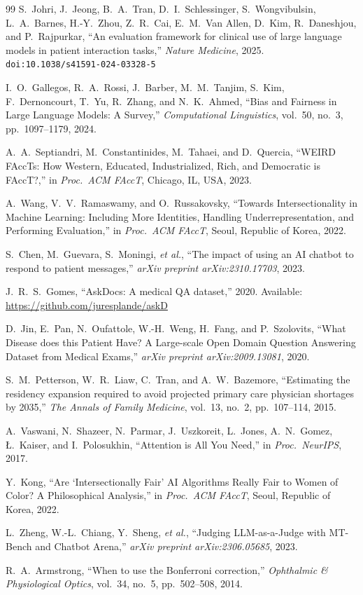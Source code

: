 \documentclass[12pt,a4paper]{article}
\begin{document}
\begin{thebibliography}{99}
S.~Johri, J.~Jeong, B.~A.~Tran, D.~I.~Schlessinger, S.~Wongvibulsin, L.~A.~Barnes, H.-Y.~Zhou, Z.~R.~Cai, E.~M.~Van Allen, D.~Kim, R.~Daneshjou, and P.~Rajpurkar, ``An evaluation framework for clinical use of large language models in patient interaction tasks,'' \emph{Nature Medicine}, 2025. \texttt{doi:10.1038/s41591-024-03328-5}

I.~O.~Gallegos, R.~A.~Rossi, J.~Barber, M.~M.~Tanjim, S.~Kim, F.~Dernoncourt, T.~Yu, R.~Zhang, and N.~K.~Ahmed, ``Bias and Fairness in Large Language Models: A Survey,'' \emph{Computational Linguistics}, vol.~50, no.~3, pp.~1097--1179, 2024.

A.~A.~Septiandri, M.~Constantinides, M.~Tahaei, and D.~Quercia, ``WEIRD FAccTs: How Western, Educated, Industrialized, Rich, and Democratic is FAccT?,'' in \emph{Proc.\ ACM FAccT}, Chicago, IL, USA, 2023.

A.~Wang, V.~V.~Ramaswamy, and O.~Russakovsky, ``Towards Intersectionality in Machine Learning: Including More Identities, Handling Underrepresentation, and Performing Evaluation,'' in \emph{Proc.\ ACM FAccT}, Seoul, Republic of Korea, 2022.

S.~Chen, M.~Guevara, S.~Moningi, \emph{et al.}, ``The impact of using an AI chatbot to respond to patient messages,'' \emph{arXiv preprint arXiv:2310.17703}, 2023.

J.~R.~S.~Gomes, ``AskDocs: A medical QA dataset,'' 2020. Available: \url{https://github.com/juresplande/askD}

D.~Jin, E.~Pan, N.~Oufattole, W.-H.~Weng, H.~Fang, and P.~Szolovits, ``What Disease does this Patient Have? A Large-scale Open Domain Question Answering Dataset from Medical Exams,'' \emph{arXiv preprint arXiv:2009.13081}, 2020.

S.~M.~Petterson, W.~R.~Liaw, C.~Tran, and A.~W.~Bazemore, ``Estimating the residency expansion required to avoid projected primary care physician shortages by 2035,'' \emph{The Annals of Family Medicine}, vol.~13, no.~2, pp.~107--114, 2015.

A.~Vaswani, N.~Shazeer, N.~Parmar, J.~Uszkoreit, L.~Jones, A.~N.~Gomez, \L.~Kaiser, and I.~Polosukhin, ``Attention is All You Need,'' in \emph{Proc.\ NeurIPS}, 2017.

Y.~Kong, ``Are `Intersectionally Fair' AI Algorithms Really Fair to Women of Color? A Philosophical Analysis,'' in \emph{Proc.\ ACM FAccT}, Seoul, Republic of Korea, 2022.

L.~Zheng, W.-L.~Chiang, Y.~Sheng, \emph{et al.}, ``Judging LLM-as-a-Judge with MT-Bench and Chatbot Arena,'' \emph{arXiv preprint arXiv:2306.05685}, 2023.

R.~A.~Armstrong, ``When to use the Bonferroni correction,'' \emph{Ophthalmic \& Physiological Optics}, vol.~34, no.~5, pp.~502--508, 2014.

\end{thebibliography}
\end{document}
